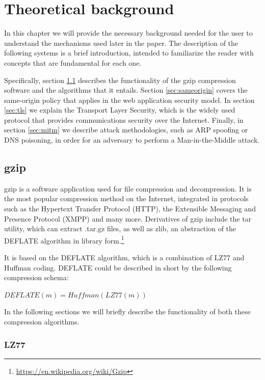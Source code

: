 \chapter{Theoretical background}\label{background}

In this chapter we will provide the necessary background needed for the user to
understand the mechanisms used later in the paper. The description of the
following systems is a brief introduction, intended to familiarize the reader
with concepts that are fundamental for each one.

Specifically, section \ref{sec:gzip} describes the functionality of the gzip
compression software and the algorithms that it entails. Section
\ref{sec:sameorigin} covers the same-origin policy that applies in the web
application security model. In section \ref{sec:tls} we explain the Transport
Layer Security, which is the widely used protocol that provides communications
security over the Internet. Finally, in section \ref{sec:mitm} we describe
attack methodologies, such as ARP spoofing or DNS poisoning, in order for an
adversary to perform a Man-in-the-Middle attack.

\section{gzip}\label{sec:gzip}

gzip is a software application used for file compression and decompression. It
is the most popular compression method on the Internet, integrated in protocols
such as the Hypertext Transfer Protocol (HTTP), the Extensible Messaging and
Presence Protocol (XMPP) and many more. Derivatives of gzip include the tar
utility, which can extract .tar.gz files, as well as zlib, an abstraction of the
DEFLATE algorithm in library
form.\footnote{\url{https://en.wikipedia.org/wiki/Gzip}}

It is based on the DEFLATE algorithm, which is a combination of LZ77 and Huffman
coding. DEFLATE could be described in short by the following compression schema:

\begin{math}DEFLATE(m) = Huffman(LZ77(m))\end{math}

In the following sections we will briefly describe the functionality of both
these compression algorithms.

\subsection{LZ77}\label{subsec:lz77}

